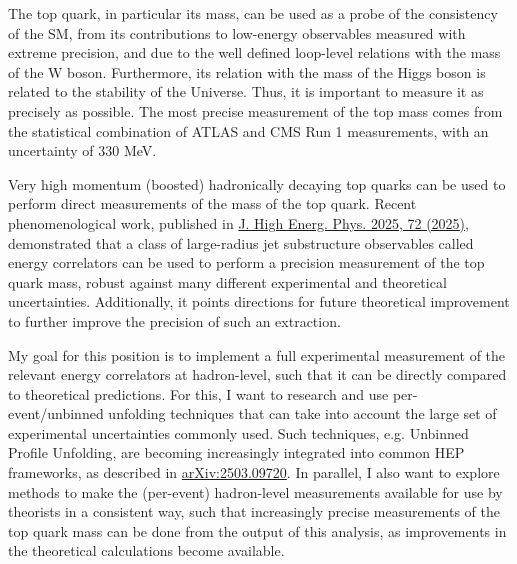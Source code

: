 \documentclass[11pt, a4paper]{awesome-cv}
\begin{document}
\begin{cvletter}
  The top quark, in particular its mass, can be used as a probe of the consistency of the SM, from its contributions to low-energy observables measured with extreme precision, and due to the well defined loop-level relations with the mass of the W boson. Furthermore, its relation with the mass of the Higgs boson is related to the stability of the Universe. Thus, it is important to measure it as precisely as possible. The most precise measurement of the top mass comes from the statistical combination of ATLAS and CMS Run 1 measurements, with an uncertainty of 330 MeV.

  Very high momentum (boosted) hadronically decaying top quarks can be used to perform direct measurements of the mass of the top quark. Recent phenomenological work, published in \href{https://doi.org/10.1007/JHEP04(2025)072}{J. High Energ. Phys. 2025, 72 (2025)}, demonstrated that a class of large-radius jet substructure observables called energy correlators can be used to perform a precision measurement of the top quark mass, robust against many different experimental and theoretical uncertainties. Additionally, it points directions for future theoretical improvement to further improve the precision of such an extraction.

  My goal for this position is to implement a full experimental measurement of the relevant energy correlators at hadron-level, such that it can be directly compared to theoretical predictions. For this, I want to research and use per-event/unbinned unfolding techniques that can take into account the large set of experimental uncertainties commonly used. Such techniques, e.g. Unbinned Profile Unfolding, are becoming increasingly integrated into common HEP frameworks, as described in \href{https://arxiv.org/abs/2503.09720}{arXiv:2503.09720}. In parallel, I also want to explore methods to make the (per-event) hadron-level measurements available for use by theorists in a consistent way, such that increasingly precise measurements of the top quark mass can be done from the output of this analysis, as improvements in the theoretical calculations become available.

  

\end{cvletter}
\end{document}

